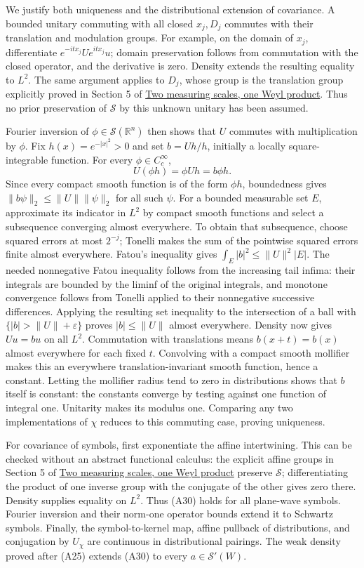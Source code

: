\documentclass[
  11pt,
]{article}
\begin{document}
We justify both uniqueness and the distributional extension of
covariance. A bounded unitary commuting with all closed \(x_j,D_j\)
commutes with their translation and modulation groups. For example, on
the domain of \(x_j\), differentiate \(e^{-itx_j}Ue^{itx_j}u\); domain
preservation follows from commutation with the closed operator, and the
derivative is zero. Density extends the resulting equality to \(L^2\).
The same argument applies to \(D_j\), whose group is the translation
group explicitly proved in Section 5 of
\href{weyl-metric-products.pdf}{Two measuring scales, one Weyl product}.
Thus no prior preservation of \(\mathcal S\) by this unknown unitary has
been assumed.

Fourier inversion of \(\phi\in\mathcal S(\mathbb R^n)\) then shows that
\(U\) commutes with multiplication by \(\phi\). Fix
\(h(x)=e^{-|x|^2}>0\) and set \(b=Uh/h\), initially a locally
square-integrable function. For every \(\phi\in C_c^\infty\), \[
U(\phi h)=\phi Uh=b\phi h.
\] Since every compact smooth function is of the form \(\phi h\),
boundedness gives \(\|b\psi\|_2\le\|U\|\|\psi\|_2\) for all such
\(\psi\). For a bounded measurable set \(E\), approximate its indicator
in \(L^2\) by compact smooth functions and select a subsequence
converging almost everywhere. To obtain that subsequence, choose squared
errors at most \(2^{-j}\); Tonelli makes the sum of the pointwise
squared errors finite almost everywhere. Fatou's inequality gives
\(\int_E|b|^2\le\|U\|^2|E|\). The needed nonnegative Fatou inequality
follows from the increasing tail infima: their integrals are bounded by
the liminf of the original integrals, and monotone convergence follows
from Tonelli applied to their nonnegative successive differences.
Applying the resulting set inequality to the intersection of a ball with
\(\{|b|>\|U\|+\varepsilon\}\) proves \(|b|\le\|U\|\) almost everywhere.
Density now gives \(Uu=bu\) on all \(L^2\). Commutation with
translations means \(b(x+t)=b(x)\) almost everywhere for each fixed
\(t\). Convolving with a compact smooth mollifier makes this an
everywhere translation-invariant smooth function, hence a constant.
Letting the mollifier radius tend to zero in distributions shows that
\(b\) itself is constant: the constants converge by testing against one
function of integral one. Unitarity makes its modulus one. Comparing any
two implementations of \(\chi\) reduces to this commuting case, proving
uniqueness.

For covariance of symbols, first exponentiate the affine intertwining.
This can be checked without an abstract functional calculus: the
explicit affine groups in Section 5 of
\href{weyl-metric-products.pdf}{Two measuring scales, one Weyl product}
preserve \(\mathcal S\); differentiating the product of one inverse
group with the conjugate of the other gives zero there. Density supplies
equality on \(L^2\). Thus (A30) holds for all plane-wave symbols.
Fourier inversion and their norm-one operator bounds extend it to
Schwartz symbols. Finally, the symbol-to-kernel map, affine pullback of
distributions, and conjugation by \(U_\chi\) are continuous in
distributional pairings. The weak density proved after (A25) extends
(A30) to every \(a\in\mathcal S'(W)\).
\end{document}
